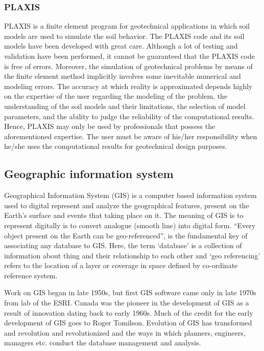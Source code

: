 \subsubsection{PLAXIS}
PLAXIS is a finite element program for geotechnical applications in which soil models are used to simulate the soil behavior. The PLAXIS code and its soil models have been developed with great care. Although a lot of testing and validation have been performed, it cannot be guaranteed that the PLAXIS code is free of errors. Moreover, the simulation of geotechnical problems by means of the finite element method implicitly involves some inevitable numerical and modeling errors. The accuracy at which reality is approximated depends highly on the expertise of the user regarding the modeling of the problem, the understanding of the soil models and their limitations, the selection of model parameters, and the ability to judge the reliability of the computational results. Hence, PLAXIS may only be used by professionals that possess the aforementioned expertise. The user must be aware of his/her responsibility when he/she uses the computational results for geotechnical design purposes. \cite{noauthor_plaxiscom_2020}

\subsection{Geographic information system}
Geographical Information System (GIS) is a computer based information system used to digital represent and analyze the geographical features, present on the Earth’s surface and events that taking place on it. The meaning of GIS is to represent digitally is to convert analogue (smooth line) into digital form.
“Every object present on the Earth can be geo-referenced”, is the fundamental key of associating any database to GIS. Here, the term ‘database’ is a collection of information about thing and their relationship to each other and ‘geo referencing’ refers to the location of a layer or coverage in space defined by co-ordinate reference system.

Work on GIS began in late 1950s, but first GIS software came only in late 1970s from lab of the ESRI. Canada was the pioneer in the development of GIS as a result of innovation dating back to early 1960s. Much of the credit for the early development of GIS goes to Roger Tomilson. Evolution of GIS has transformed and revolution and revolutionized and the ways in which planners, engineers, managers etc. conduct the database management and analysis.

